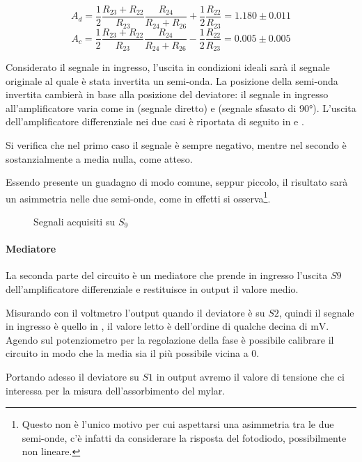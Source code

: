 $$A_d = \frac{1}{2}\frac{R_{23}+R_{22}}{R_{23}}\frac{R_{24}}{R_{24}+R_{26}} + \frac{1}{2}\frac{R_{22}}{R_{23}} = 1.180\pm0.011$$
$$A_c = \frac{1}{2}\frac{R_{23}+R_{22}}{R_{23}}\frac{R_{24}}{R_{24}+R_{26}} - \frac{1}{2}\frac{R_{22}}{R_{23}} = 0.005\pm0.005$$

Considerato il segnale in ingresso, l'uscita in condizioni ideali sarà il segnale originale al quale è stata invertita un semi-onda. La posizione della semi-onda invertita cambierà in base alla posizione del deviatore: il segnale in ingresso all'amplificatore varia come in  (segnale diretto) e  (segnale sfasato di 90°). L'uscita dell'amplificatore differenziale nei due casi è riportata di seguito in  e .

Si verifica che nel primo caso il segnale è sempre negativo, mentre nel secondo è sostanzialmente a media nulla, come atteso.

Essendo presente un guadagno di modo comune, seppur piccolo, il risultato sarà un asimmetria nelle due semi-onde, come in effetti si osserva\footnote{Questo non è l'unico motivo per cui aspettarsi una asimmetria tra le due semi-onde, c'è infatti da considerare la risposta del fotodiodo, possibilmente non lineare.}.

\begin{figure}[h]
		\centering
		\caption{Segnali acquisiti su $S_9$}
		\label{fig:s7}
\end{figure}

\paragraph{Mediatore} La seconda parte del circuito è un mediatore che prende in ingresso l'uscita $S9$ dell'amplificatore differenziale e restituisce in output il valore medio. 

Misurando con il voltmetro l'output quando il deviatore è su $S2$, quindi il segnale in ingresso è quello in , il valore letto è dell'ordine di qualche decina di $\si{\milli\volt}$. Agendo sul potenziometro per la regolazione della fase è possibile calibrare il circuito in modo che la media sia il più possibile vicina a 0.

Portando adesso il deviatore su $S1$ in output avremo il valore di tensione che ci interessa per la misura dell'assorbimento del mylar.

